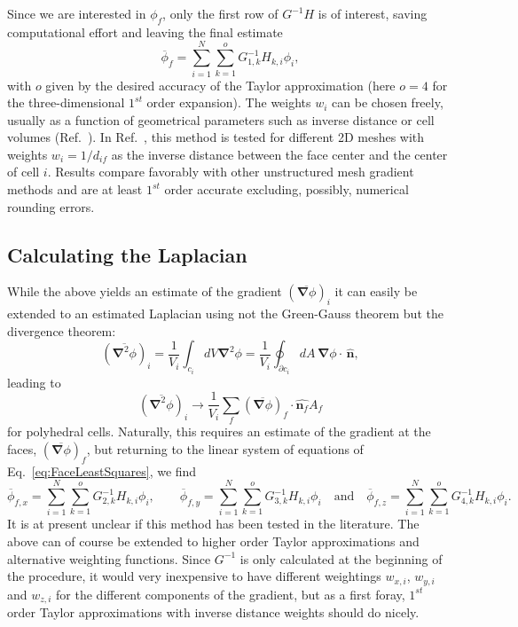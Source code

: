\documentclass[]{article}
\newcommand{\bs}[1]{\boldsymbol{#1}}
\newcommand{\Eq}[1]{\begin{equation}#1\end{equation}}
\begin{document}
Since we are interested in $\phi_f$, only the first row of $G^{-1}H$ is of interest, saving computational effort and leaving the final estimate
\Eq{\overline{\phi}_f  = \sum_{i = 1}^N\sum_{k = 1}^o G^{-1}_{1,k} H_{k,i} \phi_i,}
with $o$ given by the desired accuracy of the Taylor approximation (here $o=4$ for the three-dimensional $1^{st}$ order expansion). The weights $w_i$ can be chosen freely, usually as a function of geometrical parameters such as inverse distance or cell volumes (Ref.~\cite{Grande2016}). In Ref.~\cite{Sozer2014}, this method is tested for different 2D meshes with weights $w_i = 1/d_{if}$ as the inverse distance between the face center and the center of cell $i$. Results compare favorably with other unstructured mesh gradient methods and are at least $1^{st}$ order accurate excluding, possibly, numerical rounding errors. 

\subsection*{Calculating the Laplacian}
While the above yields an estimate of the gradient $(\overline{ \bs{\nabla}\phi})_i$ it can easily be extended to an estimated Laplacian using not the Green-Gauss theorem but the divergence theorem:
\Eq{(\overline{ \bs{\nabla}^2\phi})_i  =\frac{1}{V_i} \int_{c_i} dV  \bs{\nabla}^2\phi = \frac{1}{V_i}  \oint_{\partial c_i} dA\, \bs{\nabla}\phi \cdot\, \hat{\bs{n}},}
leading to
\Eq{(\overline{ \bs{\nabla}^2\phi})_i\rightarrow \frac{1}{V_i}\sum_f(\overline{ \bs{\nabla}\phi})_f\cdot\hat{\bs{n}_f}A_f }
for polyhedral cells. Naturally, this requires an estimate of the gradient at the faces, $(\overline{ \bs{\nabla}\phi})_f$, but returning to the linear system of equations of Eq.~\ref{eq:FaceLeastSquares}, we find
\Eq{\overline{\phi}_{f,x}  = \sum_{i = 1}^N\sum_{k = 1}^o G^{-1}_{2,k} H_{k,i} \phi_i,\qquad
       \overline{\phi}_{f,y}  = \sum_{i = 1}^N\sum_{k = 1}^o G^{-1}_{3,k} H_{k,i} \phi_i\quad \mathrm{and}\quad
       \overline{\phi}_{f,z}  = \sum_{i = 1}^N\sum_{k = 1}^o G^{-1}_{4,k} H_{k,i} \phi_i.}
It is at present unclear if this method has been tested in the literature. The above can of course be extended to higher order Taylor approximations and alternative weighting functions. Since $G^{-1}$ is only calculated at the beginning of the procedure, it would very inexpensive to have different weightings $w_{x,i}$, $w_{y,i}$ and $w_{z,i}$ for the different components of the gradient, but as a first foray, $1^{st}$  order Taylor approximations with inverse distance weights should do nicely.
\end{document}
